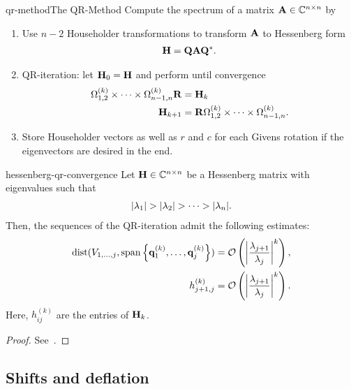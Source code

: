\begin{Algorithm*}{qr-method}{The QR-Method}
  Compute the spectrum of a matrix $\mata\in\Cnn$ by
  \begin{enumerate}
  \item Use $n-2$ Householder transformations to transform $\mata$ to
    Hessenberg form
    \begin{gather}
     \matH = \matq\mata\matq^*.
   \end{gather}
 \item QR-iteration: let $\matH_{0}=\matH$ and perform until convergence
   \begin{align}
     \Omega^{(k)}_{1,2}\times\dots\times\Omega^{(k)}_{n-1,n} \matr &= \matH_k\\
     \matH_{k+1} &= \matr \Omega^{(k)}_{1,2}\times\dots\times\Omega^{(k)}_{n-1,n}.
   \end{align}
 \item Store Householder vectors as well as $r$ and $c$ for each
   Givens rotation if the eigenvectors are desired in the end.
  \end{enumerate}
\end{Algorithm*}

\begin{Theorem}{hessenberg-qr-convergence}
    Let $\matH\in\Cnn$ be a Hessenberg matrix with eigenvalues such that
  \begin{gather}
    \abs{\lambda_1} >
    \abs{\lambda_2}>\dots>\abs{\lambda_n}.
  \end{gather}
  Then, the sequences of the QR-iteration admit the following estimates:
  \begin{align}
    \dist(\esp{1,\dots,j},\spann{\vq_1^{(k)},\dots,\vq_j^{(k)}}) &= \bigo \left(\abs*{\frac{\lambda_{j+1}}{\lambda_j}}^k\right),
    \\
    h_{j+1,j}^{(k)} &= \bigo \left(\abs*{\frac{\lambda_{j+1}}{\lambda_j}}^k\right)
                      .
  \end{align}
  Here, $h_{ij}^{(k)}$ are the entries of $\matH_k$.
\end{Theorem}

\begin{proof}
  See~\cite[Theorem 7.3-1]{GolubVanloan83}.
\end{proof}

\subsection{Shifts and deflation}

